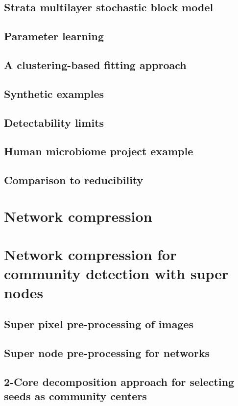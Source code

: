 \section{Strata multilayer stochastic block model}

\section{Parameter learning}

\section{A clustering-based fitting approach}

\section{Synthetic examples}

\section{Detectability limits}

\section{Human microbiome project example}

\section{Comparison to reducibility}

\chapter{Network compression}

\chapter{Network compression for community detection with super nodes}
\section{Super pixel pre-processing of images}
\section{Super node pre-processing for networks}
\section{2-Core decomposition approach for selecting seeds as community centers}
